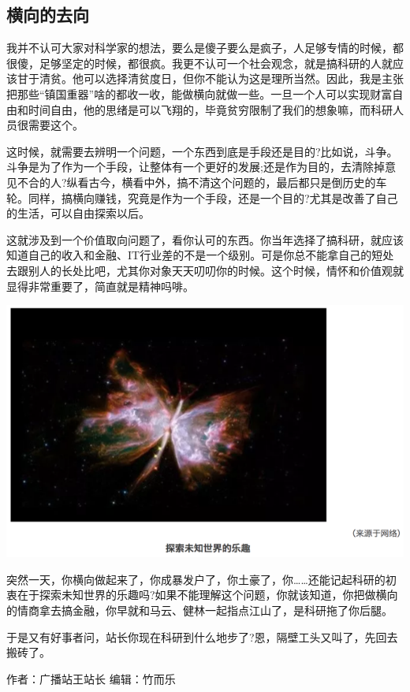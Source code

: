 \documentclass[]{book}
\begin{document}
\subsection{横向的去向}

我并不认可大家对科学家的想法，要么是傻子要么是疯子，人足够专情的时候，都很傻，足够坚定的时候，都很疯。我更不认可一个社会观念，就是搞科研的人就应该甘于清贫。他可以选择清贫度日，但你不能认为这是理所当然。因此，我是主张把那些``镇国重器''啥的都收一收，能做横向就做一些。一旦一个人可以实现财富自由和时间自由，他的思绪是可以飞翔的，毕竟贫穷限制了我们的想象嘛，而科研人员很需要这个。

这时候，就需要去辨明一个问题，一个东西到底是手段还是目的?比如说，斗争。斗争是为了作为一个手段，让整体有一个更好的发展;还是作为目的，去清除掉意见不合的人?纵看古今，横看中外，搞不清这个问题的，最后都只是倒历史的车轮。同样，搞横向赚钱，究竟是作为一个手段，还是一个目的?尤其是改善了自己的生活，可以自由探索以后。

这就涉及到一个价值取向问题了，看你认可的东西。你当年选择了搞科研，就应该知道自己的收入和金融、IT行业差的不是一个级别。可是你总不能拿自己的短处去跟别人的长处比吧，尤其你对象天天叨叨你的时候。这个时候，情怀和价值观就显得非常重要了，简直就是精神吗啡。

\includegraphics[width=8.33in]{images/kq3}

突然一天，你横向做起来了，你成暴发户了，你土豪了，你\ldots{}\ldots{}还能记起科研的初衷在于探索未知世界的乐趣吗?如果不能理解这个问题，你就该知道，你把做横向的情商拿去搞金融，你早就和马云、健林一起指点江山了，是科研拖了你后腿。

于是又有好事者问，站长你现在科研到什么地步了?恩，隔壁工头又叫了，先回去搬砖了。

作者：广播站王站长 编辑：竹而乐
\end{document}
